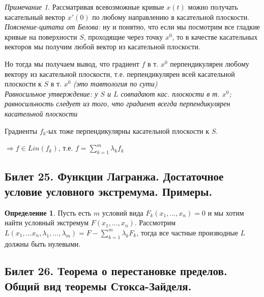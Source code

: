 \documentclass[a4paper]{article}
\theoremstyle{indented}
\theoremstyle{definition}
\newtheorem{defn}{Определение}
\theoremstyle{remark}
\newtheorem{remark}{Примечание}
\begin{document}
\begin{remark}
    Рассматривая всевозможные кривые $x(t)$ можно получать 
    касательный вектор $x'(0)$ по любому направлению в касательной плоскости.
    \textit{Пояснение-цитата от Белова:} ну и понятно, что если мы посмотрим 
    все гладкие кривые на поверхности $S$, проходящие через точку $x^0$, 
    то в качестве касательных векторов мы получим любой вектор из касательной 
    плоскости.

    Но тогда мы получаем вывод, что градиент $f$ в т. $x^0$ 
    перпендикулярен любому вектору из касательной плоскости, т.е. перпендикулярен
    всей касательной плоскости к $S$ в т. $x^0$ \textit{(это тавтология по сути)}\\
    \textit{Равносильное утверждение: у $S$ и $L$ совпадают кас. плоскости в т. $x^0$;
    равносильность следует из того, что градиент всегда перпендикулярен касательной плоскости}

    Градиенты $f_k$-ых тоже перпендикулярны касательной плоскости к $S$. 

    $\Rightarrow f \in Lin(f_k)$, т.е. $f=\sum\limits_{k=1}^{m} \lambda_k f_k$
\end{remark}



\subsection{Билет 25. Функции Лагранжа. Достаточное условие условного экстремума. Примеры.}%

\begin{defn}
    Пусть есть $m$ условий вида $F_k(x_1, ... , x_n) = 0$ и мы хотим найти условный 
    экстремум $F(x_1, ... , x_n)$. Рассмотрим  
    $L(x_1, ... x_n, \lambda_1, ..., \lambda_m)=F-\sum\limits_{k=1}^{m} \lambda_k F_k$,
    тогда все частные производные $L$ должны быть нулевыми. 
\end{defn}



\subsection{Билет 26. Теорема о перестановке пределов. Общий вид теоремы Стокса-Зайделя.}%
\end{document}
